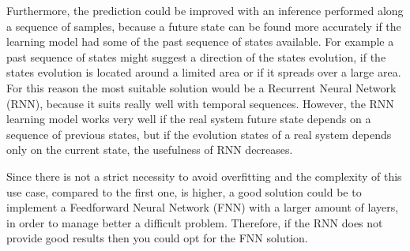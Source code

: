 Furthermore, the prediction could be improved with an inference performed along a sequence of samples, because a future state can be found more accurately if the learning model had some of the past sequence of states available. For example a past sequence of states might suggest a direction of the states evolution, if the states evolution is located around a limited area or if it spreads over a large area. For this reason the most suitable solution would be a Recurrent Neural Network (RNN), because it suits really well with temporal sequences. However, the RNN learning model works very well if the real system future state depends on a sequence of previous states, but if the evolution states of a real system depends only on the current state, the usefulness of RNN decreases.

Since there is not a strict necessity to avoid overfitting and the complexity of this use case, compared to the first one, is higher, a good solution could be to implement a Feedforward Neural Network (FNN) with a larger amount of layers, in order to manage better a difficult problem. Therefore, if the RNN does not provide good results then you could opt for the FNN solution.
